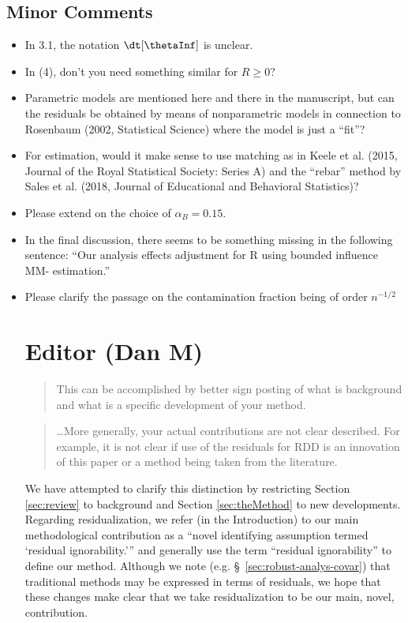 \documentclass[12pt]{article}
\begin{document}
\subsection{Minor Comments}
\begin{itemize}
\item In 3.1, the notation $\dt[\thetaInf]$ is unclear.
\item In (4), don’t you need something similar for $R\ge 0$?
\item Parametric models are mentioned here and there in the
  manuscript, but can the residuals be obtained by means of
  nonparametric models in connection to Rosenbaum (2002, Statistical
  Science) where the model is just a ``fit''?
\item For estimation, would it make sense to use matching as in Keele
  et al. (2015, Journal of the Royal Statistical Society: Series A)
  and the “rebar” method by Sales et al. (2018, Journal of Educational
  and Behavioral Statistics)?
\item Please extend on the choice of $\alpha_B=0.15$.
\item In the final discussion, there seems to be something missing in
  the following sentence: “Our analysis effects adjustment for R using
  bounded influence MM- estimation.”
\item Please clarify the passage on the contamination fraction being of
order $n^{-1/2}$


\section{Editor (Dan M)}

\begin{quote}
This can be accomplished by better sign posting of what
is background and what is a specific development of your
method.
\end{quote}
\begin{quote}
\dots More generally, your actual contributions
are not clear described. For example, it is not clear if use of the
residuals for RDD is an innovation of this paper or a method being
taken from the literature.
\end{quote}
We have attempted to clarify this distinction by restricting Section
\ref{sec:review} to background and Section \ref{sec:theMethod} to new
developments. Regarding residualization, we refer (in the
Introduction) to our main
methodological contribution as a ``novel identifying assumption termed
`residual ignorability.''' and generally use the term ``residual
ignorability'' to define our method.
Although we note (e.g. \S~\ref{sec:robust-analys-covar}) that
traditional methods may be expressed in terms of residuals, we hope
that these changes make clear that we take residualization to be our
main, novel, contribution.


\end{itemize}
\end{document}
